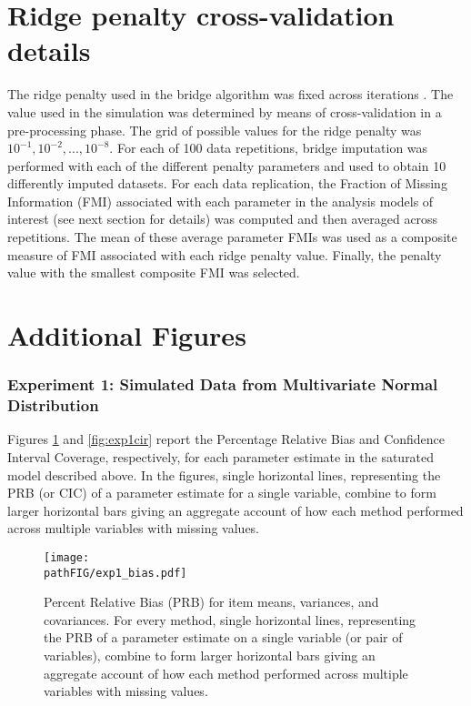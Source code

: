 \documentclass[]{./cls/interact}
\theoremstyle{plain}
\theoremstyle{definition}
\theoremstyle{remark}
\newcommand{\pathFIG}{./figures}
\begin{document}
\section{Ridge penalty cross-validation details}
	The ridge penalty used in the bridge algorithm was fixed across iterations .
	The value used in the simulation was determined by means of cross-validation in a pre-processing phase.
	The grid of possible values for the ridge penalty was $10^{-1}, 10^{-2}, ..., 10^{-8}$.
	For each of 100 data repetitions, bridge imputation was performed with each of the different penalty parameters
	and used to obtain 10 differently imputed datasets.
	For each data replication, the Fraction of Missing Information (FMI) \citep{savaleiRhemtulla:2012} associated with 
	each parameter in the analysis models of interest (see next section for details) was computed and then averaged across 
	repetitions.
	The mean of these average parameter FMIs was used as a composite measure of FMI associated with each ridge penalty
	value.
	Finally, the penalty value with the smallest composite FMI was selected.

\section{Additional Figures}

\subsubsection{Experiment 1: Simulated Data from Multivariate Normal Distribution}

	Figures \ref{fig:exp1bias} and \ref{fig:exp1cir} report the Percentage Relative Bias and Confidence Interval 
	Coverage, respectively, for each parameter estimate in the saturated model described above. 
	In the figures, single horizontal lines, representing the PRB (or CIC) of a parameter estimate for a single 
	variable, combine to form larger horizontal bars giving an aggregate account of how each method performed 
	across multiple variables with missing values.

\begin{figure}
\centering
\texttt{[image: \\pathFIG/exp1\_bias.pdf]}
\caption{\label{fig:exp1bias}
	Percent Relative Bias (PRB) for item means, variances, and covariances.
	For every method, single horizontal lines, representing the PRB of a parameter estimate on 
	a single variable (or pair of variables), combine to form larger horizontal bars giving an 
	aggregate account of how each method performed across multiple variables with missing values.
	}
\end{figure}
\end{document}

